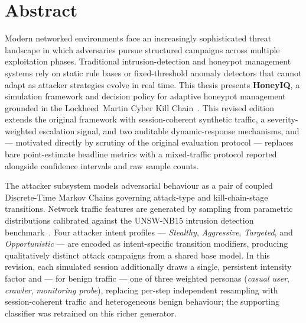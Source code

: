 \chapter*{Abstract}

Modern networked environments face an increasingly sophisticated threat landscape
in which adversaries pursue structured campaigns across multiple exploitation
phases.
Traditional intrusion-detection and honeypot management systems rely on static
rule bases or fixed-threshold anomaly detectors that cannot adapt as attacker
strategies evolve in real time.
This thesis presents \textbf{HoneyIQ}, a simulation framework and decision
policy for adaptive honeypot management grounded in the Lockheed~Martin
Cyber Kill Chain~\citep{hutchins2011intelligence}.
This revised edition extends the original framework with session-coherent
synthetic traffic, a severity-weighted escalation signal, and two auditable
dynamic-response mechanisms, and --- motivated directly by scrutiny of the
original evaluation protocol --- replaces bare point-estimate headline
metrics with a mixed-traffic protocol reported alongside confidence
intervals and raw sample counts.

The attacker subsystem models adversarial behaviour as a pair of coupled
Discrete-Time Markov Chains governing attack-type and kill-chain-stage
transitions.
Network traffic features are generated by sampling from parametric
distributions calibrated against the UNSW-NB15 intrusion detection
benchmark~\citep{moustafa2015unsw}.
Four attacker intent profiles --- \emph{Stealthy}, \emph{Aggressive},
\emph{Targeted}, and \emph{Opportunistic} --- are encoded as intent-specific
transition modifiers, producing qualitatively distinct attack campaigns from
a shared base model.
In this revision, each simulated session additionally draws a single,
persistent intensity factor and --- for benign traffic --- one of three
weighted personas (\emph{casual user}, \emph{crawler}, \emph{monitoring
probe}), replacing per-step independent resampling with session-coherent
traffic and heterogeneous benign behaviour; the supporting classifier was
retrained on this richer generator.

